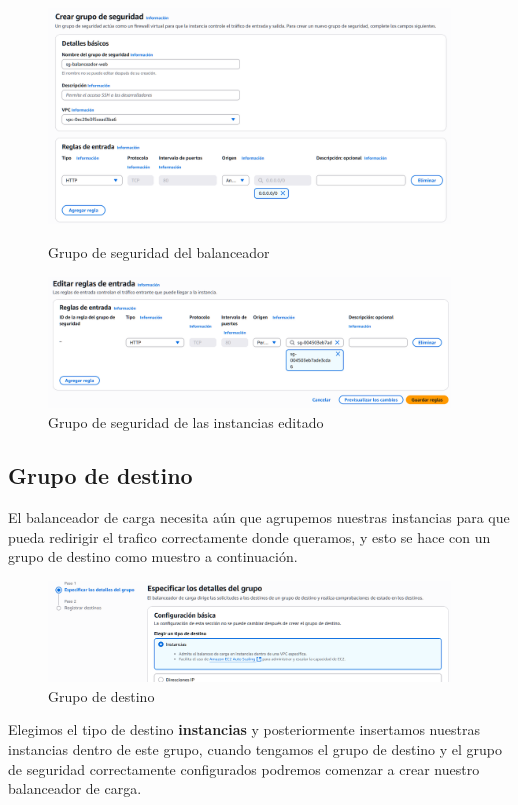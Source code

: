 \documentclass{article}
\begin{document}
	\begin{figure}[H]
	\centering
	\includegraphics[width=0.95\textwidth]{grupo_de_seguridad_balanceador.png}
	\caption{Grupo de seguridad del balanceador}
	\includegraphics[width=0.95\textwidth]{editar_reglas_grupo_seguridad.png}
	\caption{Grupo de seguridad de las instancias editado}
	\end{figure}

\subsection{Grupo de destino}

	El balanceador de carga necesita aún que agrupemos nuestras instancias para que pueda redirigir el trafico correctamente donde queramos, y esto se hace con un grupo de destino como muestro a continuación.

	\begin{figure}[H]
	\centering
	\includegraphics[width=0.95\textwidth]{grupo_de_destino.png}
	\caption{Grupo de destino}
	\end{figure}

	Elegimos el tipo de destino \textbf{instancias} y posteriormente insertamos nuestras instancias dentro de este grupo, cuando tengamos el grupo de destino y el grupo de seguridad correctamente configurados podremos comenzar a crear nuestro balanceador de carga.
\end{document}
